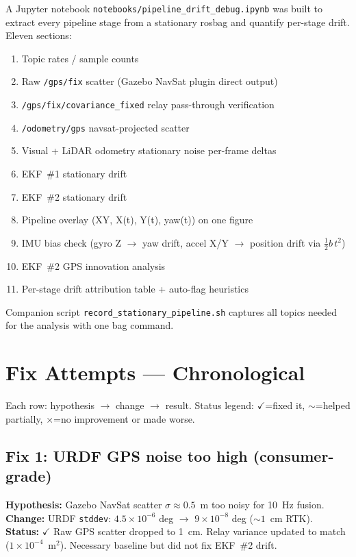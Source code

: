 \documentclass[11pt,a4paper]{article}
\newcommand{\good}[1]{\textcolor{good}{\textbf{#1}}}
\newcommand{\bad}[1]{\textcolor{bad}{\textbf{#1}}}
\newcommand{\partialw}[1]{\textcolor{partial}{\textbf{#1}}}
\begin{document}
A Jupyter notebook \texttt{notebooks/pipeline\_drift\_debug.ipynb} was built to extract every
pipeline stage from a stationary rosbag and quantify per-stage drift. Eleven sections:
\begin{enumerate}[noitemsep]
\item Topic rates / sample counts
\item Raw \texttt{/gps/fix} scatter (Gazebo NavSat plugin direct output)
\item \texttt{/gps/fix/covariance\_fixed} relay pass-through verification
\item \texttt{/odometry/gps} navsat-projected scatter
\item Visual + LiDAR odometry stationary noise per-frame deltas
\item EKF~\#1 stationary drift
\item EKF~\#2 stationary drift
\item Pipeline overlay (XY, X(t), Y(t), yaw(t)) on one figure
\item IMU bias check (gyro Z $\to$ yaw drift, accel X/Y $\to$ position drift via $\frac{1}{2}b\,t^2$)
\item EKF~\#2 GPS innovation analysis
\item Per-stage drift attribution table + auto-flag heuristics
\end{enumerate}

\noindent
Companion script \texttt{record\_stationary\_pipeline.sh} captures all topics needed for
the analysis with one bag command.

\section{Fix Attempts --- Chronological}

Each row: hypothesis $\to$ change $\to$ result. Status legend:
\good{$\checkmark$}=fixed it, \partialw{$\sim$}=helped partially, \bad{$\times$}=no improvement or made worse.

\subsection{Fix 1: URDF GPS noise too high (consumer-grade)}
\textbf{Hypothesis:} Gazebo NavSat scatter $\sigma\!\approx\!0.5$~m too noisy for 10~Hz fusion.\\
\textbf{Change:} URDF \texttt{stddev}: $4.5\!\times\!10^{-6}$ deg $\to$ $9\!\times\!10^{-8}$ deg ($\sim\!1$~cm RTK).\\
\textbf{Status:} \good{$\checkmark$} Raw GPS scatter dropped to 1~cm. Relay variance updated to match
($1\!\times\!10^{-4}$~m$^2$). Necessary baseline but did not fix EKF~\#2 drift.
\end{document}
